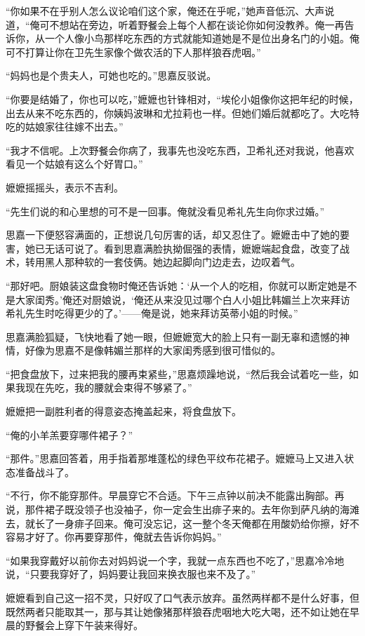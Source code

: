 \par “你如果不在乎别人怎么议论咱们这个家，俺还在乎呢，”她声音低沉、大声说道，“俺可不想站在旁边，听着野餐会上每个人都在谈论你如何没教养。俺一再告诉你，从一个人像小鸟那样吃东西的方式就能知道她是不是位出身名门的小姐。俺可不打算让你在卫先生家像个做农活的下人那样狼吞虎咽。”
\par “妈妈也是个贵夫人，可她也吃的。”思嘉反驳说。
\par “你要是结婚了，你也可以吃，”嬷嬷也针锋相对，“埃伦小姐像你这把年纪的时候，出去从来不吃东西的，你姨妈波琳和尤拉莉也一样。但她们婚后就都吃了。大吃特吃的姑娘家往往嫁不出去。”
\par “我才不信呢。上次野餐会你病了，我事先也没吃东西，卫希礼还对我说，他喜欢看见一个姑娘有这么个好胃口。”
\par 嬷嬷摇摇头，表示不吉利。
\par “先生们说的和心里想的可不是一回事。俺就没看见希礼先生向你求过婚。”
\par 思嘉一下便怒容满面的，正想说几句厉害的话，却又忍住了。嬷嬷击中了她的要害，她已无话可说了。看到思嘉满脸执拗倔强的表情，嬷嬷端起食盘，改变了战术，转用黑人那种软的一套伎俩。她边起脚向门边走去，边叹着气。
\par “那好吧。厨娘装这盘食物时俺还告诉她：‘从一个人的吃相，你就可以断定她是不是大家闺秀。’俺还对厨娘说，‘俺还从来没见过哪个白人小姐比韩媚兰上次来拜访希礼先生时吃得更少的了。'——俺是说，她来拜访英蒂小姐的时候。”
\par 思嘉满脸狐疑，飞快地看了她一眼，但嬷嬷宽大的脸上只有一副无辜和遗憾的神情，好像为思嘉不是像韩媚兰那样的大家闺秀感到很可惜似的。
\par “把食盘放下，过来把我的腰再束紧些，”思嘉烦躁地说，“然后我会试着吃一些，如果我现在先吃，我的腰就会束得不够紧了。”
\par 嬷嬷把一副胜利者的得意姿态掩盖起来，将食盘放下。
\par “俺的小羊羔要穿哪件裙子？”
\par “那件。”思嘉回答着，用手指着那堆蓬松的绿色平纹布花裙子。嬷嬷马上又进入状态准备战斗了。
\par “不行，你不能穿那件。早晨穿它不合适。下午三点钟以前决不能露出胸部。再说，那件裙子既没领子也没袖子，你一定会生出痱子来的。去年你到萨凡纳的海滩去，就长了一身痱子回来。俺可没忘记，这一整个冬天俺都在用酸奶给你擦，好不容易才好了。你再要穿那件，俺就去告诉你妈妈。”
\par “如果我穿戴好以前你去对妈妈说一个字，我就一点东西也不吃了，”思嘉冷冷地说，“只要我穿好了，妈妈要让我回来换衣服也来不及了。”
\par 嬷嬷看到自己这一招不灵，只好叹了口气表示放弃。虽然两样都不是什么好事，但既然两者只能取其一，那与其让她像猪那样狼吞虎咽地大吃大喝，还不如让她在早晨的野餐会上穿下午装来得好。

